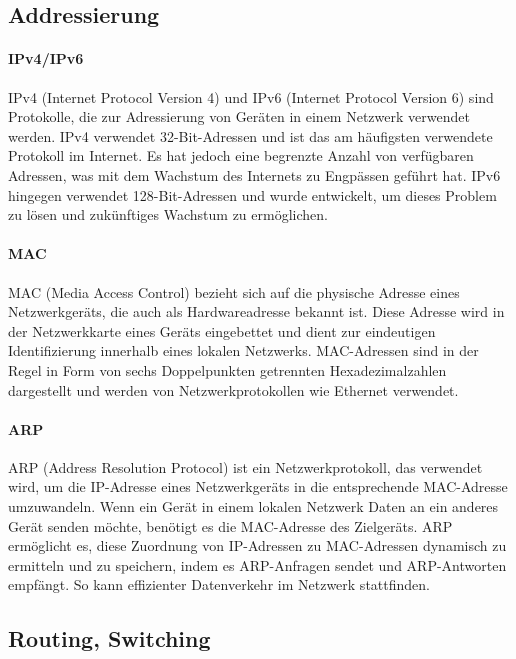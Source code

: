 \subsection{Addressierung}

\paragraph{IPv4/IPv6}

IPv4 (Internet Protocol Version 4) und IPv6 (Internet Protocol Version 6) sind Protokolle, die zur Adressierung von Geräten in einem Netzwerk verwendet werden. IPv4 verwendet 32-Bit-Adressen und ist das am häufigsten verwendete Protokoll im Internet. Es hat jedoch eine begrenzte Anzahl von verfügbaren Adressen, was mit dem Wachstum des Internets zu Engpässen geführt hat. IPv6 hingegen verwendet 128-Bit-Adressen und wurde entwickelt, um dieses Problem zu lösen und zukünftiges Wachstum zu ermöglichen.

\paragraph{MAC}

MAC (Media Access Control) bezieht sich auf die physische Adresse eines Netzwerkgeräts, die auch als Hardwareadresse bekannt ist. Diese Adresse wird in der Netzwerkkarte eines Geräts eingebettet und dient zur eindeutigen Identifizierung innerhalb eines lokalen Netzwerks. MAC-Adressen sind in der Regel in Form von sechs Doppelpunkten getrennten Hexadezimalzahlen dargestellt und werden von Netzwerkprotokollen wie Ethernet verwendet.

\paragraph{ARP}

ARP (Address Resolution Protocol) ist ein Netzwerkprotokoll, das verwendet wird, um die IP-Adresse eines Netzwerkgeräts in die entsprechende MAC-Adresse umzuwandeln. Wenn ein Gerät in einem lokalen Netzwerk Daten an ein anderes Gerät senden möchte, benötigt es die MAC-Adresse des Zielgeräts. ARP ermöglicht es, diese Zuordnung von IP-Adressen zu MAC-Adressen dynamisch zu ermitteln und zu speichern, indem es ARP-Anfragen sendet und ARP-Antworten empfängt. So kann effizienter Datenverkehr im Netzwerk stattfinden.

\subsection{Routing, Switching}

